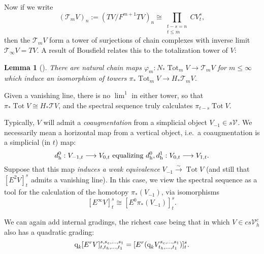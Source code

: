\documentclass[11pt]{amsart}
\theoremstyle{plain}
\newtheorem{lem}[thm]{Lemma}
\newtheorem{cor}[thm]{Corollary}
\theoremstyle{definition}
\DeclareMathOperator{\Tot}{Tot}
\let\phi\varphi
\renewcommand{\to}{\longrightarrow}
\newcommand{\scrC}{\mathscr{C}}
\newcommand{\calT}{\mathcal{T}}
\newcommand{\calV}{\mathcal{V}}
\theoremstyle{plain}
\newcommand{\vect}[2]{\calV^{#1}_{#2}}
\newcommand{\quadgrad}[1]{\textup{q}_{#1}}
\newcommand{\algs}{{\scrC\!\textit{om}}}
\newcommand{\E}[5]{[E^{#1}_{#2}#3]^{#4}_{#5}}
\newcommand{\dhor}{_\textup{h}}
\begin{document}
\begin{Conventions and notation}
Now if we write
\[(\calT_mV)_n:=(TV/F^{m+1} TV)_n\cong\prod_{\substack{t-s=n\\t\leq m}}CV^{s}_{t}, \]
then the $\calT_mV$ form a tower of surjections of chain complexes with inverse limit $\calT_\infty V=TV$.  A result of Bousfield relates this to the totalization tower of $V$:
\begin{lem}[{\cite[Lemma 2.2]{BousfieldHSSCS.pdf}}]
There are natural chain maps $\phi_m:N_*\Tot_mV\to \calT_mV$ for $m\leq\infty$ which induce an isomorphism of towers $\pi_*\Tot_mV\to H_*\calT_mV$.
\end{lem}
\noindent Given a vanishing line, there is no $\lim^1$ in either tower, so that $\pi_*\Tot V\cong H_*\calT V$, and the spectral sequence truly calculates $\pi_{t-s} \Tot V$.

Typically, $V$ will admit a \emph{coaugmentation} from a simplicial object $V_{-1}\in s\vect{}{}$.  We necessarily mean a horizontal map from a vertical object, i.e.\ a coaugmentation is a simplicial (in $t$) map:
\[d\dhor^0:V_{-1,t}\to V_{0,t}\textup{ equalizing }d\dhor^0,d\dhor^1:V_{0,t}\to V_{1,t}.\]
Suppose that this map \emph{induces a weak equivalence} $V_{-1}\overset{\sim}{\to}\Tot V$ (and still that $\E{2}{}{V}{s}{t}$ admits a vanishing line).
In this case, we view the spectral sequence as a tool for the calculation of the homotopy $\pi_*(V_{-1})$, via  isomorphisms
\[\E{\infty}{}{V}{s}{t}\cong \E{0}{}{\pi_*(V_{-1})}{s}{t}.\]

We can again add internal gradings, the richest case being that in which  $V\in cs\vect{c}{h}$ also has a quadratic grading:
\[\quadgrad{k}\E{r}{}{V}{s,s_c,\ldots,s_1}{t,t_h,\ldots,t_1}=\E{r}{}{(\quadgrad{k}V^{s_c,\ldots,s_1}_{t_h,\ldots,t_1})}{s}{t}.\]
%
%
%
%
%
%
%












\end{Conventions and notation}
\end{document}
